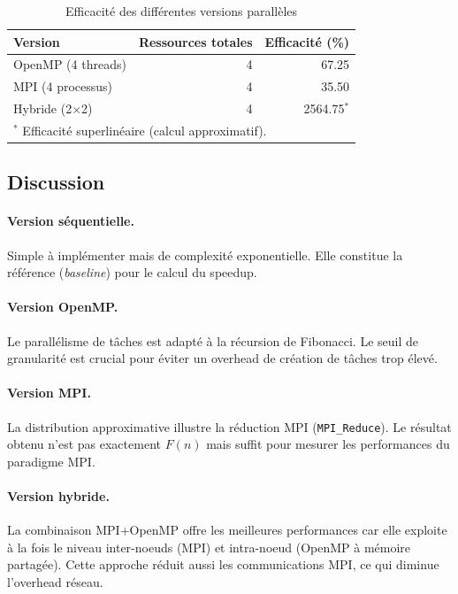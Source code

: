 \documentclass[12pt, a4paper]{article}
\begin{document}
\begin{table}[h!]
    \centering
    \caption{Efficacité des différentes versions parallèles}
    \label{tab:fib_eff}
    \begin{tabular}{lrr}
        \toprule
        \textbf{Version} & \textbf{Ressources totales} & \textbf{Efficacité (\%)} \\
        \midrule
        OpenMP (4 threads)    & 4 & 67.25 \\
        MPI (4 processus)     & 4 & 35.50 \\
        Hybride (2$\times$2)  & 4 & 2564.75$^{*}$ \\
        \bottomrule
        \multicolumn{3}{l}{\small $^{*}$ Efficacité superlinéaire (calcul approximatif).}
    \end{tabular}
\end{table}

\subsection{Discussion}

\paragraph{Version séquentielle.}
Simple \`a implémenter mais de complexité exponentielle. Elle constitue la référence (\textit{baseline})
pour le calcul du speedup.

\paragraph{Version OpenMP.}
Le parallélisme de t\^aches est adapté \`a la récursion de Fibonacci. Le seuil de granularité est crucial
pour éviter un overhead de création de t\^aches trop élevé.

\paragraph{Version MPI.}
La distribution approximative illustre la réduction MPI (\texttt{MPI\_Reduce}). Le résultat obtenu n'est
pas exactement $F(n)$ mais suffit pour mesurer les performances du paradigme MPI.

\paragraph{Version hybride.}
La combinaison MPI+OpenMP offre les meilleures performances car elle exploite \`a la fois le niveau inter-noeuds
(MPI) et intra-noeud (OpenMP \`a mémoire partagée). Cette approche réduit aussi les communications MPI,
ce qui diminue l'overhead réseau.
\end{document}
